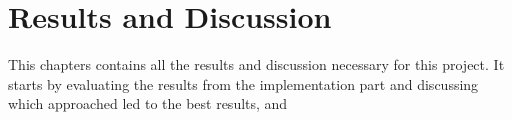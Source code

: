 \chapter{Results and Discussion}
This chapters contains all the results and discussion necessary for this project. It starts by evaluating the results from the implementation part and discussing which approached led to the best results, and 



